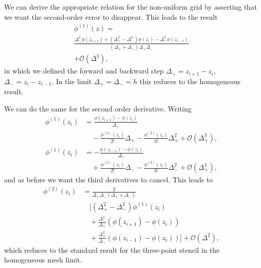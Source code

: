 \documentclass[reprint, amsmath,amssymb, aps]{revtex4-1}
\begin{document}
We can derive the appropriate relation for the non-uniform grid by asserting that we want the second-order error to disappear. This leads to the result
\begin{multline}
  \phi^{(1)}\left(z\right) = \\ \frac{\Delta_-^2 \phi \left(z_{i + 1}\right) + \left(\Delta_+^2 - \Delta_-^2\right) \phi\left(z_i\right) - \Delta_+^2 \phi\left(z_{i-1}\right)}{\left(\Delta_+  + \Delta_-\right)\Delta_+ \Delta_-}\\ + \mathcal{O}\left(\Delta^3 \right),
\end{multline}
in which we defined the forward and backward step $\Delta_+ = z_{i+1} - z_i$, $\Delta_- = z_i - z_{i-1}$. In the limit $\Delta_+ = \Delta_- = h$ this reduces to the homogeneous result.

We can do the same for the second order derivative. Writing 
\begin{align}
  \phi^{(1)}\left(z_i\right) &= \frac{\phi\left(z_{i+1}\right) - \phi\left(z_i\right)}{\Delta_+} \nonumber \\ 
                             & \quad - \frac{\phi^{(2)}\left(z_i\right)}{2!}\Delta_+ - \frac{\phi^{(3)}\left(z_i\right)}{3!} \Delta_+^2 + \mathcal{O}\left(\Delta_+^3\right), \\
  \phi^{(1)}\left(z_i\right) &= - \frac{\phi\left(z_{i-1}\right) - \phi\left(z_i\right)}{\Delta_-} \nonumber \\ 
                             & \quad + \frac{\phi^{(2)}\left(z_i\right)}{2!}\Delta_- - \frac{\phi^{(3)}\left(z_i\right)}{3!} \Delta_-^2 + \mathcal{O}\left(\Delta_+^3\right),
\end{align}
and as before we want the third derivatives to cancel. This leads to
\begin{align}
  \phi^{(2)}\left(z_i\right) &= \frac{2}{\Delta_+ \Delta_- \left(\Delta_+ + \Delta_-\right)} \nonumber \\
                             & \quad \biggr[ \left(\Delta_+^2 - \Delta_-^2\right) \phi^{(1)}\left(z_i\right) \nonumber \\
                             & \quad + \frac{\Delta_-^2}{\Delta_+} \left(\phi\left(z_{i+1}\right) - \phi\left(z_i\right)\right) \nonumber \\ 
                             & \quad + \frac{\Delta_+^2}{\Delta_-} \left(\phi\left(z_{i-1}\right) - \phi\left(z_i\right)\right)\biggr] + \mathcal{O}\left(\Delta^2\right),
\end{align}
which reduces to the standard result for the three-point stencil in the homogeneous mesh limit.
\end{document}

